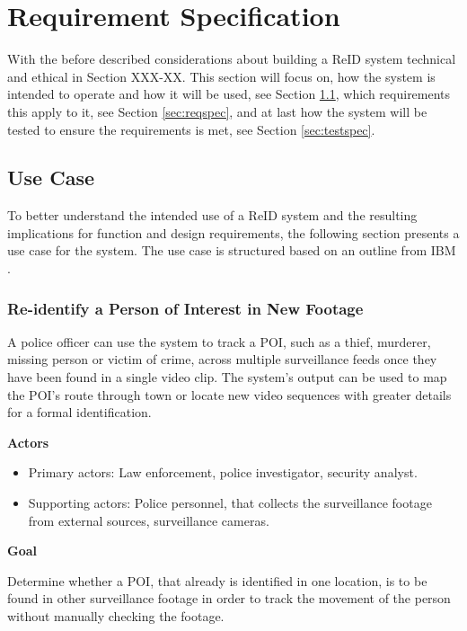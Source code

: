 \chapter{Requirement Specification} 
\label{cha:reqspec}

With the before described considerations about building a \acs{ReID} system technical and ethical in Section XXX-XX.
This section will focus on, how the system is intended to operate and how it will be used, see Section \ref{sec:usecase}, which requirements this apply to it, see Section \ref{sec:reqspec}, and at last how the system will be tested to ensure the requirements is met, see Section \ref{sec:testspec}.

\section{Use Case}
\label{sec:usecase}

To better understand the intended use of a \acs{ReID} system and the resulting implications for function and design requirements, the following section presents a use case for the system. The use case is structured based on an outline from IBM \cite{usecase}.

\subsection{Re-identify a Person of Interest in New Footage}
A police officer can use the system to track a \acs{POI}, such as a thief, murderer, missing person or victim of crime, across multiple surveillance feeds once they have been found in a single video clip. The system's output can be used to map the \ac{POI}'s route through town or locate new video sequences with greater details for a formal identification.

\vspace{1em}

\noindent\textbf{Actors}
\begin{itemize}
    \item Primary actors: Law enforcement, police investigator, security analyst.
    \item Supporting actors: Police personnel, that collects the surveillance footage from external sources, surveillance cameras.
\end{itemize}
\vspace{1em}

\noindent\textbf{Goal}

\noindent Determine whether a \acs{POI}, that already is identified in one location, is to be found in other surveillance footage in order to track the movement of the person without manually checking the footage.

